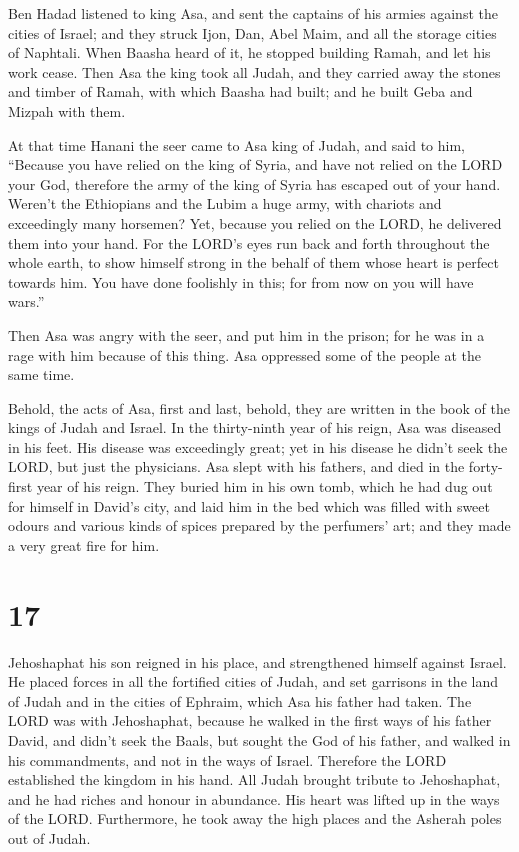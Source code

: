  Ben Hadad listened to king Asa, and sent the captains of
his armies against the cities of Israel; and they struck Ijon, Dan, Abel
Maim, and all the storage cities of Naphtali.  When Baasha
heard of it, he stopped building Ramah, and let his work cease.
 Then Asa the king took all Judah, and they carried away
the stones and timber of Ramah, with which Baasha had built; and he
built Geba and Mizpah with them.

 At that time Hanani the seer came to Asa king of Judah,
and said to him, ``Because you have relied on the king of Syria, and
have not relied on the LORD your God, therefore the army of the king of
Syria has escaped out of your hand.  Weren't the
Ethiopians and the Lubim a huge army, with chariots and exceedingly many
horsemen? Yet, because you relied on the LORD, he delivered them into
your hand.  For the LORD's eyes run back and forth
throughout the whole earth, to show himself strong in the behalf of them
whose heart is perfect towards him. You have done foolishly in this; for
from now on you will have wars.''

 Then Asa was angry with the seer, and put him in the
prison; for he was in a rage with him because of this thing. Asa
oppressed some of the people at the same time.

 Behold, the acts of Asa, first and last, behold, they
are written in the book of the kings of Judah and Israel.
 In the thirty-ninth year of his reign, Asa was diseased
in his feet. His disease was exceedingly great; yet in his disease he
didn't seek the LORD, but just the physicians.  Asa slept
with his fathers, and died in the forty-first year of his reign.
 They buried him in his own tomb, which he had dug out
for himself in David's city, and laid him in the bed which was filled
with sweet odours and various kinds of spices prepared by the perfumers'
art; and they made a very great fire for him.

\hypertarget{section-16}{%
\section{17}\label{section-16}}

 Jehoshaphat his son reigned in his place, and
strengthened himself against Israel.  He placed forces in
all the fortified cities of Judah, and set garrisons in the land of
Judah and in the cities of Ephraim, which Asa his father had taken.
 The LORD was with Jehoshaphat, because he walked in the
first ways of his father David, and didn't seek the Baals,
 but sought the God of his father, and walked in his
commandments, and not in the ways of Israel.  Therefore
the LORD established the kingdom in his hand. All Judah brought tribute
to Jehoshaphat, and he had riches and honour in abundance.
 His heart was lifted up in the ways of the LORD.
Furthermore, he took away the high places and the Asherah poles out of
Judah.

